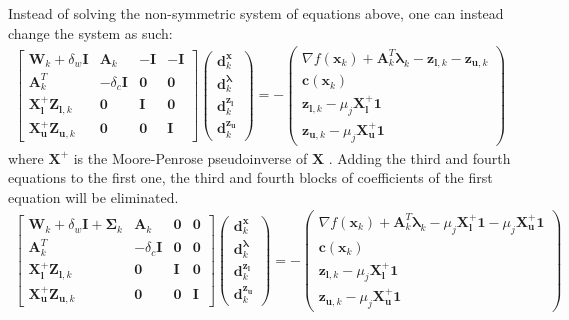   Instead of solving the non-symmetric system of equations above, one can instead change the system as such:
  \begin{align}
      \begin{bmatrix}
        \bm{W}_k + \delta_w \bm{I} & \bm{A}_k & -\bm{I} & -\bm{I} \\
        \bm{A}_k^T & -\delta_c \bm{I} & \bm{0} & \bm{0} \\
        \bm{X}_{\bm{l}}^{+} \bm{Z}_{\bm{l},k} & \bm{0} & \bm{I} & \bm{0} \\
        \bm{X}_{\bm{u}}^{+} \bm{Z}_{\bm{u},k} & \bm{0} & \bm{0} & \bm{I}
      \end{bmatrix} \begin{pmatrix}
        \bm{d}_k^{\bm{x}} \\
        \bm{d}_k^{\bm{\lambda}} \\
        \bm{d}_k^{\bm{z}_{\bm{l}}} \\
        \bm{d}_k^{\bm{z}_{\bm{u}}}
      \end{pmatrix} = - \begin{pmatrix}
        \nabla f(\bm{x}_k) + \bm{A}_k^T \bm{\lambda}_k - \bm{z}_{\bm{l}, k} - \bm{z}_{\bm{u}, k}  \\
        \bm{c}(\bm{x}_k) \\
        \bm{z}_{\bm{l}, k} - \mu_j \bm{X}_{\bm{l}}^{+} \bm{1} \\
        \bm{z}_{\bm{u}, k} - \mu_j \bm{X}_{\bm{u}}^{+} \bm{1}
      \end{pmatrix}
  \end{align}
  where $\bm{X}^{+}$ is the Moore-Penrose pseudoinverse of $\bm{X}$ \citep{Golub1996}. Adding the third and fourth equations to the first one, the third and fourth blocks of coefficients of the first equation will be eliminated.
  \begin{align}
      \begin{bmatrix}
        \bm{W}_k + \delta_w \bm{I} + \bm{\Sigma}_k & \bm{A}_k & \bm{0} & \bm{0} \\
        \bm{A}_k^T & -\delta_c \bm{I} & \bm{0} & \bm{0} \\
        \bm{X}_{\bm{l}}^{+} \bm{Z}_{\bm{l},k} & \bm{0} & \bm{I} & \bm{0} \\
        \bm{X}_{\bm{u}}^{+} \bm{Z}_{\bm{u},k} & \bm{0} & \bm{0} & \bm{I}
      \end{bmatrix} \begin{pmatrix}
        \bm{d}_k^{\bm{x}} \\
        \bm{d}_k^{\bm{\lambda}} \\
        \bm{d}_k^{\bm{z}_{\bm{l}}} \\
        \bm{d}_k^{\bm{z}_{\bm{u}}}
      \end{pmatrix} = - \begin{pmatrix}
        \nabla f(\bm{x}_k) + \bm{A}_k^T \bm{\lambda}_k - \mu_j \bm{X}_{\bm{l}}^{+} \bm{1} - \mu_j \bm{X}_{\bm{u}}^{+} \bm{1}  \\
        \bm{c}(\bm{x}_k) \\
        \bm{z}_{\bm{l}, k} - \mu_j \bm{X}_{\bm{l}}^{+} \bm{1} \\
        \bm{z}_{\bm{u}, k} - \mu_j \bm{X}_{\bm{u}}^{+} \bm{1}
      \end{pmatrix}
  \end{align}
